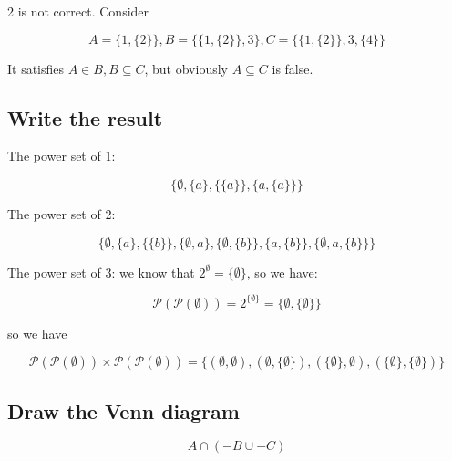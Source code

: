 \documentclass{article}
\begin{document}
\quad

2 is not correct. Consider

$$
    A=\{1, \{2\}\},B=\{\{1, \{2\}\}, 3\},C=\{\{1, \{2\}\}, 3, \{4\}\}
$$

It satisfies $A\in B, B\subseteq C$, but obviously $A\subseteq C$ is false.

\subsection{Write the result}

\quad

The power set of 1:

$$
    \{\emptyset,\{a\},\{\{a\}\},\{a,\{a\}\}\}
$$

The power set of 2:

$$
    \{\emptyset,\{a\},\{\{b\}\}, \{\emptyset,a\},\{\emptyset,\{b\}\},\{a,\{b\}\},\{\emptyset,a,\{b\}\}\}
$$

The power set of 3: we know that $2^{\emptyset}=\{\emptyset\}$, so we have:

$$
    \mathcal{P}(\mathcal{P}(\emptyset))=2^{\{\emptyset\}}=\{\emptyset,\{\emptyset\}\}
$$

so we have 

$$
    \mathcal{P}(\mathcal{P}(\emptyset))\times\mathcal{P}(\mathcal{P}(\emptyset))=\{(\emptyset,\emptyset),(\emptyset,\{\emptyset\}),(\{\emptyset\},\emptyset),(\{\emptyset\},\{\emptyset\})\}
$$

\subsection{Draw the Venn diagram}

$$
    A\cap(-B\cup-C)
$$

\begin{center}
    \begin{minipage}{0.5\textwidth}
        \centering
    \end{minipage}
\end{center}
\end{document}
